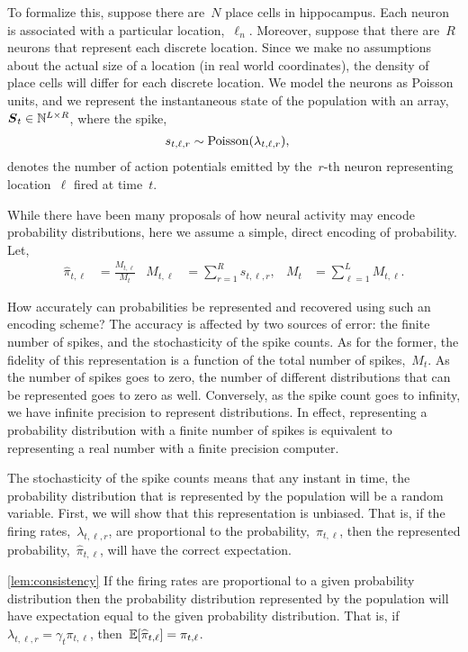 To formalize this, suppose there are~$N$ place cells in
hippocampus. Each neuron is associated with a particular
location,~$\ell_n$. Moreover, suppose that there are~$R$ neurons that
represent each discrete location.  Since we make no assumptions about
the actual size of a location (in real world coordinates), the density
of place cells will differ for each discrete location.
We model the neurons as Poisson units, and we represent the instantaneous 
state of the population with an array,~${\boldsymbol{S}_t \in \mathbb{N}^{L \times R}}$,
where the  spike,
\begin{align}
s_{t,\ell,r} &\sim \mathrm{Poisson}(\lambda_{t, \ell, r}),
\end{align} denotes the number of action potentials
emitted by the~$r$-th neuron
representing location~$\ell$ fired at time~$t$.

While there have been many proposals of how neural activity may encode
probability distributions, here we assume a simple, direct encoding of
probability. Let,
\begin{align}
  \label{eq:pr_rep}
  \widehat{\pi}_{t, \ell} &= \frac{M_{t, \ell}}{M_t} &
  M_{t,\ell} &= \sum_{r=1}^R s_{t,\ell,r}, &
  M_t &= \sum_{\ell=1}^L M_{t,\ell}.
\end{align}

How accurately can probabilities be represented and recovered using 
such an encoding scheme? The accuracy is affected by two sources of error: 
the finite number of spikes, and the stochasticity of the spike 
counts. As for the former, the fidelity of this representation 
is a function of the total number of spikes,~$M_t$. As the number 
of spikes goes to zero, the number of different distributions that 
can be represented goes to zero as well. Conversely, as the spike 
count goes to infinity, we have infinite precision to represent 
distributions. In effect, representing a probability distribution 
with a finite number of spikes is equivalent to representing a 
real number with a finite precision computer. 

The stochasticity of the spike counts means that any instant in 
time, the probability distribution that is represented by the population will 
be a random variable.  First, we will show that this representation 
is unbiased. That is, if the firing rates,~$\lambda_{t, \ell, r}$, 
are proportional to the probability,~$\pi_{t,\ell}$, then the 
represented probability,~$\widehat{\pi}_{t, \ell}$, will have the  
correct expectation.

\begin{lemma}
\ref{lem:consistency}
If the firing rates are proportional to a given
probability distribution then the probability distribution represented by the 
population will have expectation equal to the given probability distribution.
That is, if~$\lambda_{t, \ell, r}=\gamma_t \pi_{t,\ell}$, 
then~$\mathbb{E}[\widehat{\pi}_{t,\ell}] = \pi_{t,\ell}$.
\end{lemma}

